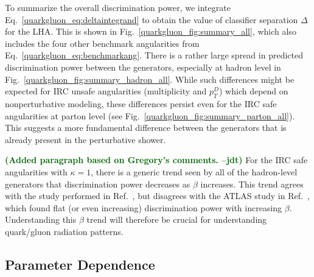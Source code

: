 \documentclass[11pt]{cernrep}
\newcommand{\jdt}[1]{\textbf{\textcolor{darkgreen}{(#1 --jdt)}}}
\begin{document}
To summarize the overall discrimination power, we integrate
Eq.~\eqref{quarkgluon_eq:deltaintegrand} to obtain the value of
classifier separation $\Delta$ for the LHA.  This is shown in
Fig.~\ref{quarkgluon_fig:summary_all}, which also includes the four
other benchmark angularities from
Eq.~\eqref{quarkgluon_eq:benchmarkang}.  There is a rather large
spread in predicted discrimination power between the generators,
especially at hadron level in
Fig.~\ref{quarkgluon_fig:summary_hadron_all}.  While such differences
might be expected for IRC unsafe angularities (multiplicity and
$p_T^D$) which depend on nonperturbative modeling, these differences
persist even for the IRC safe angularities at parton level (see
Fig.~\ref{quarkgluon_fig:summary_parton_all}).  This suggests a more
fundamental difference between the generators that is already present
in the perturbative shower.

\jdt{Added paragraph based on Gregory's comments.}  For the IRC safe angularities with $\kappa = 1$, there is a generic trend seen by all of the hadron-level generators that discrimination power decreases as $\beta$ increases.  This trend agrees with the study performed in Ref.~\cite{Larkoski:2013eya}, but disagrees with the ATLAS study in Ref.~\cite{Aad:2014gea}, which found flat (or even increasing) discrimination power with increasing $\beta$.  Understanding this $\beta$ trend will therefore be crucial for understanding quark/gluon radiation patterns.

\subsection{Parameter Dependence}
\label{quarkgluon_sec:ee_scales}
\end{document}
